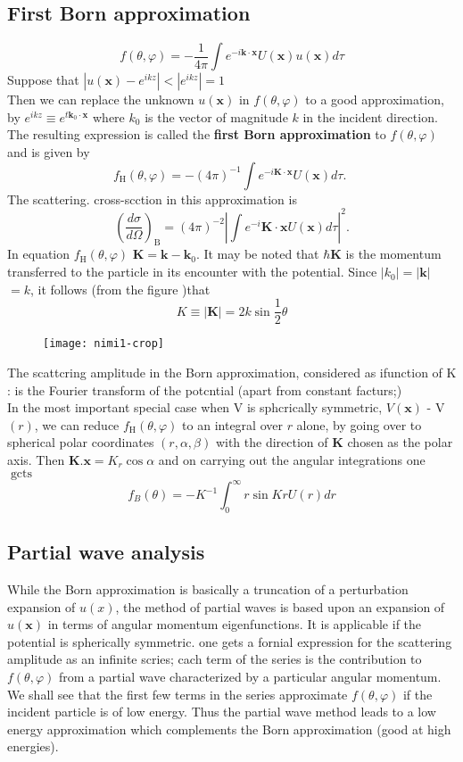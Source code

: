 \subsection{First Born approximation}
$$f(\theta, \varphi)=-\frac{1}{4 \pi} \int e^{-i \mathbf{k} \cdot \mathbf{x}} U(\mathbf{x}) u(\mathbf{x}) d \tau$$
Suppose that $\left|u(\mathbf{x})-e^{i k z}\right|<\left|e^{i k z}\right|=1$\\
Then we can replace the unknown $u(\mathbf{x})$ in $f(\theta, \varphi)$ to a good approximation, by $e^{i k z} \equiv e^{t \mathbf{k}_{0} \cdot \mathbf{x}}$ where $k_{0}$ is the vector of magnitude $k$ in the incident direction. The resulting expression is called the \textbf{first Born approximation} to $f(\theta, \varphi)$ and is given by
$$
f_{\mathrm{H}}(\theta, \varphi)=-(4 \pi)^{-1} \int e^{-i \mathbf{K} \cdot \mathbf{x}} U(\mathbf{x}) d \tau \text {. }
$$
The scattering. cross-scction in this approximation is
$$
\left(\frac{d \sigma}{d \Omega}\right)_{\mathrm{B}}=(4 \pi)^{-2}\left|\int e^{-i} \mathbf{K} \cdot \mathbf{x} U(\mathbf{x}) d \tau\right|^{2} .
$$
In equation $f_{\mathrm{H}}(\theta, \varphi)$  $\mathbf{K}=\mathbf{k}- \mathbf{k}_{0}$. It may be noted that $\hbar \mathbf{K}$ is the momentum transferred to the particle in its encounter with the potential. Since $\left|k_{0}\right|=|\mathbf{k}|$ $=k$, it follows (from the figure )that
$$K \equiv|\mathbf{K}|=2 k \sin \frac{1}{2} \theta$$
\begin{figure}[H]
	\centering
	\texttt{[image: nimi1-crop]}
	\caption{}
	\label{}
\end{figure}
The scattcring amplitude in the Born approximation, considered as ifunction of $\mathrm{K}$ : is the Fourier transform of the potcntial (apart from constant facturs;)\\
In the most important special case when V is sphcrically symmetric, $V(\mathbf{x})$ - V $(r)$, we can reduce $
f_{\mathrm{H}}(\theta, \varphi)$ to an integral over $r$ alone, by going over to spherical polar coordinates $(r, \alpha, \beta)$ with the direction of $\mathbf{K}$ chosen as the polar axis. Then $\mathbf{K} . \mathbf{x}=K_{r} \cos \alpha$ and on carrying out the angular integrations one $\operatorname{gcts}$
$$
f_{B}(\theta)=-K^{-1} \int_{0}^{\infty} r \sin K r U(r) d r
$$
\subsection{Partial wave analysis}
While the Born approximation is basically a truncation of a perturbation expansion of $u(x)$, the method of partial waves is based upon an expansion of $u(\mathbf{x})$ in terms of angular momentum eigenfunctions. It is applicable if the potential is spherically symmetric. one gets a fornial expression for the scattering amplitude as an infinite scries; cach term of the series is the contribution to $f(\theta, \varphi)$ from a partial wave characterized by a particular angular momentum. We shall see that the first few terms in the series approximate $f(\theta, \varphi)$ if the incident particle is of low energy. Thus the partial wave method leads to a low energy approximation which complements the Born approximation (good at high energies).
